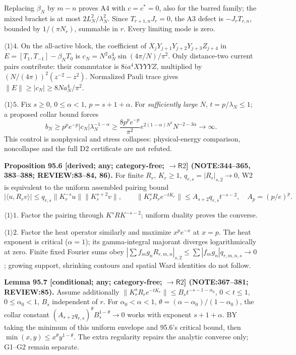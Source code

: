 Replacing \(\beta_N\) by \(m-n\) proves A4 with \(c=c^*=0\), also for the barred family;
the mixed bracket is at most \(2L_N^2/\lambda_N^2\). Since \(T_{r+1,n}J_r=0\), the A3 defect is
\(-J_rT_{r,n}\), bounded by \(1/(\pi N_r)\), summable in \(r\). Every limiting mode is zero.
\par\(\langle1\rangle4\). On the all-active block, the coefficient of \(X_jY_{j+1}Y_{j+2}Y_{j+3}Z_{j+4}\)
in \(E=[T_1,T_{-1}]-\beta_NT_0\) is \(c_N=N^2a_N^4\sin(4\pi/N)/\pi^2\).
Only distance-two current pairs contribute: their commutator is \(8ia^4XYYYZ\), multiplied by
\((N/(4\pi))^2(z^{-2}-z^2)\). Normalized Pauli trace gives \(\|E\|\ge|c_N|\ge8Na_N^4/\pi^2\).
\par\(\langle1\rangle5\). Fix \(s\ge0\), \(0\le\alpha<1\), \(p=s+1+\alpha\).
For \emph{sufficiently large} \(N\), \(t=p/\lambda_N\le1\); a proposed collar bound forces
\[
 b_N\ge p^pe^{-p}|c_N|\lambda_N^{-1-\alpha}
 \ge\frac{8p^pe^{-p}}{\pi^2}e^{2(1-\alpha)N^2}N^{-2-3\alpha}\longrightarrow\infty.
\]
This control is nonphysical and stress collapses: physical-energy comparison, noncollapse and the full D2 certificate are not refuted.

\textbf{Proposition 95.6 [derived; any; category-free; \(\to\mathsf R2\)] (NOTE:344--365, 383--388; REVIEW:83--84, 86).}
For finite \(R_r\), \(K_r\ge1\), \(q_{r,s}=|R_r|_{s,2}\to0\), W2 is equivalent to the uniform assembled pairing bound
\[
 |\langle u,R_rv\rangle|\le q_{r,s}\|K_r^{-s}u\|\|K_r^{s+2}v\|,
 \qquad \|K_r^sR_re^{-tK_r}\|\le A_{s+2}q_{r,s}t^{-s-2},\quad A_p=(p/e)^p.
\]
\par\(\langle1\rangle1\). Factor the pairing through \(K^sRK^{-s-2}\); uniform duality proves the converse.
\par\(\langle1\rangle2\). Factor the heat operator similarly and maximize \(x^pe^{-x}\) at \(x=p\).
The heat exponent is critical (\(\alpha=1\)); its gamma-integral majorant diverges logarithmically at zero.
Finite fixed Fourier sums obey \(|\sum f_mg_nR_{r,m,n}|_{s,2}\le\sum|f_mg_n|q_{r,m,n,s}\to0\);
growing support, shrinking contours and spatial Ward identities do not follow.

\textbf{Lemma 95.7 [conditional; any; category-free; \(\to\mathsf R2\)] (NOTE:367--381; REVIEW:85).}
Assume additionally \(\|K_r^sR_re^{-tK_r}\|\le B_st^{-s-1-\alpha_0}\), \(0<t\le1\),
\(0\le\alpha_0<1\), \(B_s\) independent of \(r\). For \(\alpha_0<\alpha<1\),
\(\theta=(\alpha-\alpha_0)/(1-\alpha_0)\), the collar constant
\((A_{s+2}q_{r,s})^\theta B_s^{1-\theta}\to0\) works with exponent \(s+1+\alpha\).
BY taking the minimum of this uniform envelope and 95.6's critical bound, then
\(\min(x,y)\le x^\theta y^{1-\theta}\). The extra regularity repairs the analytic converse only; G1--G2 remain separate.

